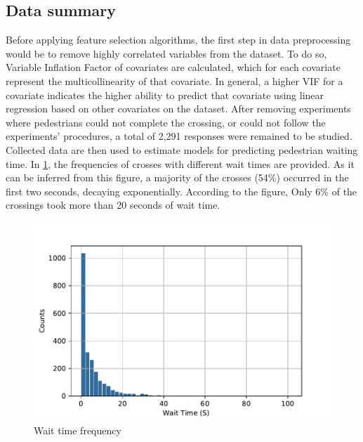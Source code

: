 \subsection{Data summary}
Before applying feature selection algorithms, the first step in data preprocessing would be to remove highly correlated variables from the dataset. To do so, Variable Inflation Factor of covariates are calculated, which for each covariate represent the multicollinearity of that covariate. In general, a higher VIF for a covariate indicates the higher ability to predict that covariate using linear regression based on other covariates on the dataset. After removing experiments where pedestrians could not complete the crossing, or could not follow the experiments' procedures, a total of 2,291 responses were remained to be studied. Collected data are then used to estimate models for predicting pedestrian waiting time. In \cref{fig:waitfreq}, the frequencies of crosses with different wait times are provided. As it can be inferred from this figure, a majority of the crosses (54\%) occurred in the first two seconds, decaying exponentially. According to the figure, Only 6\% of the crossings took more than 20 seconds of wait time.
\begin{figure}
    \centering
    \includegraphics[scale=0.6]{chapter_4/figures/waitfreq.pdf}
    \caption{Wait time frequency}
    \label{fig:waitfreq}
\end{figure}
